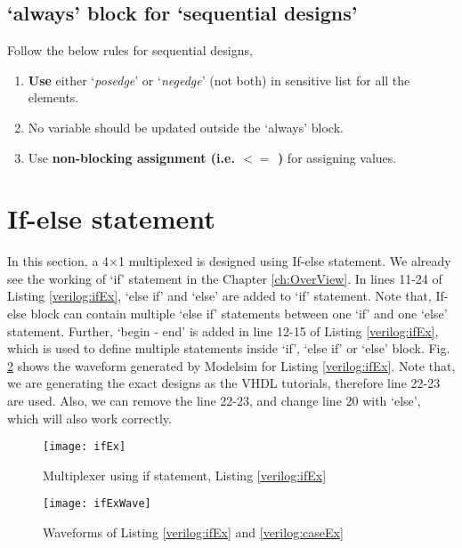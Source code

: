 \subsection{`always' block for `sequential designs'}
Follow the below rules for sequential designs, 
\begin{enumerate}
	\item \textbf{Use} either `\textit{posedge}' or `\textit{negedge}' (not both) in sensitive list for all the elements. 
	\item No variable should be updated outside the `always' block. 
	\item Use \textbf{non-blocking assignment (i.e. $<=$ )} for assigning values. 
\end{enumerate}


\section{If-else statement} \label{sec:ifElse}
In this section, a 4$\times$1 multiplexed is designed using If-else statement. We already see the working of `if' statement in the Chapter \ref{ch:OverView}. In lines 11-24 of Listing \ref{verilog:ifEx}, `else if' and `else' are added to `if' statement. Note that, If-else block can contain multiple `else if' statements between one `if' and one `else' statement. Further, `begin - end' is added in line 12-15 of Listing \ref{verilog:ifEx}, which is used to define multiple statements inside `if', `else if' or `else' block.  Fig. \ref{fig:ifExWave} shows the waveform generated by Modelsim for Listing \ref{verilog:ifEx}. 
Note that, we are generating the exact designs as the VHDL tutorials, therefore line 22-23 are used. Also, we can remove the line 22-23, and change line 20 with `else', which will also work correctly. 

\begin{figure}[!h]
	\centering
	\texttt{[image: ifEx]}
	\caption{Multiplexer using if statement, Listing \ref{verilog:ifEx}}
	\label{fig:ifEx}
\end{figure} 



\begin{figure}
	\centering
	\texttt{[image: ifExWave]}
	\caption{Waveforms of Listing \ref{verilog:ifEx} and \ref{verilog:caseEx}}
	\label{fig:ifExWave}
\end{figure}
%
%
%
%
